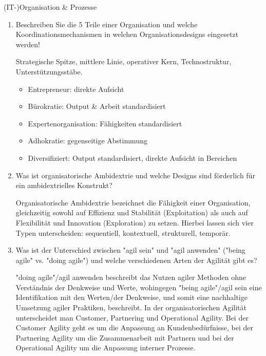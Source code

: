 \documentclass{article}
\begin{document}
\begin{exercise}{(IT-)Organisation \& Prozesse}
\begin{enumerate}
    \item Beschreiben Sie die 5 Teile einer Organisation und welche Koordinationsmechanismen in welchen Organisationsdesigns eingesetzt werden!

          \begin{solution}
            Strategische Spitze, mittlere Linie, operativer Kern, Technostruktur, Unterstützungsstäbe.

            \begin{itemize}
              \item Entrepreneur: direkte Aufsicht
              \item Bürokratie: Output \& Arbeit standardisiert
              \item Expertenorganisation: Fähigkeiten standardisiert
              \item Adhokratie: gegenseitige Abstimmung
              \item Diversifiziert: Output standardisiert, direkte Aufsicht in Bereichen
            \end{itemize}
          \end{solution}

    \item Was ist organisatorische Ambidextrie und welche Designs sind förderlich für ein ambidextrielles Konstrukt?
          \begin{solution}
            Organisatorische Ambidextrie bezeichnet die Fähigkeit einer Organisation, gleichzeitig sowohl auf Effizienz und Stabilität (Exploitation) als auch auf Flexibilität und Innovation (Exploration) zu setzen. Hierbei lassen sich vier Typen unterscheiden: sequentiell, kontextuell, strukturell, temporär.
          \end{solution}

    \item Was ist der Unterschied zwischen "agil sein" und "agil anwenden" ("being agile" vs. "doing agile") und welche verschiedenen Arten der Agilität gibt es?
          \begin{solution}
            "doing agile"/agil anwenden beschreibt das Nutzen agiler Methoden ohne Verständnis der Denkweise und Werte, wohingegen "being agile"/agil sein eine Identifikation mit den Werten/der Denkweise, und somit eine nachhaltige Umsetzung agiler Praktiken, beschreibt. In der organisatorischen Agilität unterscheidet man Customer, Partnering und Operational Agility. Bei der Customer Agility geht es um die Anpassung an Kundenbedürfnisse, bei der Partnering Agility um die Zusammenarbeit mit Partnern und bei der Operational Agility um die Anpassung interner Prozesse.
          \end{solution}


\end{enumerate}
\end{exercise}
\end{document}
